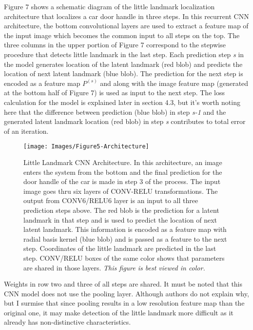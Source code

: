\documentclass [11pt,letterpaper ,twoside ,openany ]{report}
\begin{document}
    Figure 7 shows a schematic diagram of the little landmark localization architecture that localizes a car door handle in three steps. In this recurrent CNN architecture, the bottom convolutional layers are used to extract a feature map of the input image which becomes the common input to all steps on the top.  The three columns in the upper portion of Figure 7 correspond to the stepwise procedure that detects little landmark in the last step. Each prediction step \textit{s} in the model generates location of the latent landmark (red blob) and predicts the location of next latent landmark (blue blob). The prediction for the next step is encoded as a feature map \(P^{(s)}\) and along with the image feature map (generated at the bottom half of Figure 7) is used as input to the next step. The loss calculation for the model is explained later in section 4.3, but it's worth noting here that the difference between prediction (blue blob) in step \textit {s-1} and the generated latent landmark location (red blob) in step \textit {s} contributes to total error of an iteration.

    \begin{figure}[h]
      \centering
      \texttt{[image: Images/Figure5-Architecture]}
      \caption{Little Landmark CNN Architecture. In this architecture, an image enters the system from the bottom and the final prediction for the door handle of the car is made in step 3 of the process. The input image goes thru six layers of CONV-RELU transformations. The output from CONV6/RELU6 layer is an input to all three prediction steps above. The red blob is the prediction for a latent landmark in that step and is used to predict the location of next latent landmark. This information is encoded as a feature map with radial basis kernel (blue blob) and is passed as a feature to the next step. Coordinates of the little landmark are predicted in the last step. CONV/RELU boxes of the same color shows that parameters are shared in those layers. \textit{This figure is best viewed in color.}}
      \label{fig:arch}
    \end{figure}            

    Weights in row two and three of all steps are shared. It must be noted that this CNN model does not use the pooling layer. Although authors do not explain why, but I surmise that since pooling results in a low resolution feature map than the original one, it may make detection of the little landmark more difficult as it already has non-distinctive characteristics.
\end{document}
